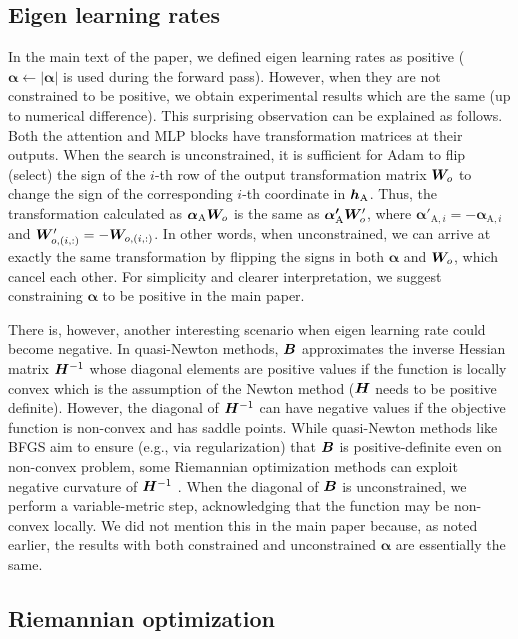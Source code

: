 \documentclass{article} %
\begin{document}
\subsection{Eigen learning rates}
\label{appendix:elrs}

In the main text of the paper, we defined eigen learning rates as positive ($\bm{\alpha}\leftarrow|\bm{\alpha}|$ is used during the forward pass). However, when they are not constrained to be positive, we obtain experimental results which are the same (up to numerical difference). This surprising observation can be explained as follows. Both the attention and MLP blocks have transformation matrices at their outputs. When the search is unconstrained, it is sufficient for Adam to flip (select) the sign of the $i$-th row of the output transformation matrix ${\bm{W}}_o$ to change the sign of the corresponding $i$-th coordinate in ${\bm{h}}_{\text{A}}$. Thus, the transformation calculated as $\bm{\alpha_{\text{A}}}{\bm{W}}_o$ is the same as $\bm{\alpha'_{\text{A}}}{\bm{W}}'_o$, where 
$\bm{\alpha}'_{\text{A},i}=-\bm{\alpha}_{\text{A},i}$
and ${\bm{W}}'_{o,(i,:)}=-{\bm{W}}_{o,(i,:)}$. In other words, when unconstrained, we can arrive at exactly the same transformation by flipping the signs in both $\bm{\alpha}$ and ${\bm{W}}_o$, which cancel each other. For simplicity and clearer interpretation, we suggest constraining $\bm{\alpha}$ to be positive in the main paper.

There is, however, another interesting scenario when eigen learning rate could become negative. 
In quasi-Newton methods, ${\bm{B}}$ approximates the inverse Hessian matrix  ${\bm{H}}^{-1}$ whose diagonal elements are positive values if the function is locally convex  which is the assumption of the Newton method (${\bm{H}}$ needs to be positive definite). However, the diagonal of ${\bm{H}}^{-1}$ can have negative values if the objective function is non-convex and has saddle points. While quasi-Newton methods like BFGS aim to ensure (e.g., via regularization) that ${\bm{B}}$ is positive-definite even on non-convex problem, some Riemannian optimization methods can exploit negative curvature of ${\bm{H}}^{-1}$ \citep{agarwal2021adaptive}. When the diagonal of ${\bm{B}}$ is unconstrained, we perform a variable-metric step, acknowledging that the function may be non-convex locally. We did not mention this in the main paper because, as noted earlier, the results with both constrained and unconstrained $\bm{\alpha}$ are essentially the same.


\subsection{Riemannian optimization}
\label{appendix:riem}
\end{document}
